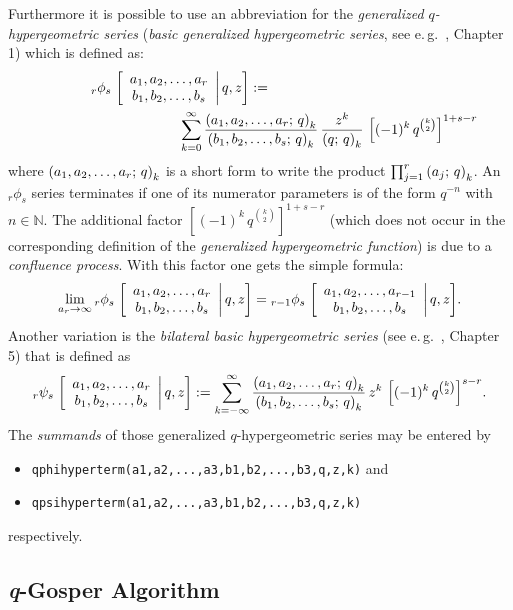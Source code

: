 Furthermore it is possible to use an abbreviation for the
{\sl generalized $q$-hypergeometric series}
({\sl basic generalized hypergeometric series},
see e.\,g.\ \cite{GasperRahman:90}, Chapter 1) which is defined as:
\begin{eqnarray*}
	\qphihyp{r}{s}{a_1,a_2,\ldots,a_r}{b_1,b_2,\ldots,b_s}{z}:=
	\hspace{15em}\\ \hspace{10em}
	\sum_{k=0}^{\infty}{\frac{\qfac{a_1,a_2,\ldots,a_r}{k}}
	{\qfac{b_1,b_2,\ldots,b_s}{k}}
	\,\frac{z^k}{\qfac{q}{k}}\,\left[(-1)^k\,
	q^{\binom{k}{2}}\right]^{1+s-r}}
\end{eqnarray*}
where $\left(a_1,a_2,\ldots,a_r;\,q\right)_{k}$ is a short form to write the
product $\prod_{j=1}^r{\left(a_j;\,q\right)_{k}}$. An ${}_r\phi_s$ series
terminates if one of its numerator parameters is of the form
$q^{-n}$ with $n\in\mathbb{N}$. The additional factor
$\left[(-1)^k\,q^{\binom{k}{2}}\right]^{1+s-r}$ (which does not
occur in the corresponding definition of the {\sl generalized
hypergeometric function}) is due to a {\sl confluence process}.
With this factor one gets the simple formula:
\[
	\lim_{a_r\rightarrow\infty}{{}_{r}\phi_{s}\left.\left[\begin{array}{c} a_1,a_2,\ldots,a_r \\ b_1,b_2,\ldots,b_s \end{array}\right|q,z\right]} =
	{{}_{r-1}\phi_{s}\left.\left[\begin{array}{c} a_1,a_2,\ldots,a_{r-1} \\ b_1,b_2,\ldots,b_s \end{array}\right|q,z\right]}.
\]
Another variation is the {\sl bilateral basic hypergeometric
series} (see e.\,g.\ \cite{GasperRahman:90}, Chapter 5) that is defined as
\[
	{}_{r}\psi_{s}\left.\left[\begin{array}{c} a_1,a_2,\ldots,a_r \\ b_1,b_2,\ldots,b_s \end{array}\right|q,z\right]:=
	\sum_{k=-\infty}^{\infty}{\frac{\left(a_1,a_2,\ldots,a_r;\,q\right)_{k}}
	{\left(b_1,b_2,\ldots,b_s;\,q\right)_{k}}\,z^k\,
	\left[(-1)^k\,q^{\binom{k}{2}}\right]^{s-r}}.
\]
The \textsl{summands} of those generalized $q$-hypergeometric series may
be entered by
\begin{itemize}
	\item \texttt{qphihyperterm({a1,a2,...,a3},{b1,b2,...,b3},q,z,k)}
		and
	\item \texttt{qpsihyperterm({a1,a2,...,a3},{b1,b2,...,b3},q,z,k)}
\end{itemize}
respectively.


\subsection{\textsl{q}-Gosper Algorithm}
\label{qgosper}

